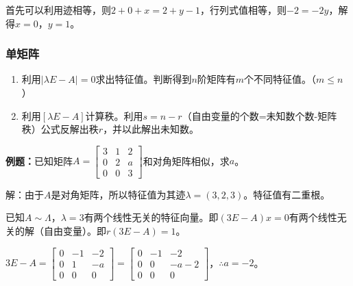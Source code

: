 首先可以利用迹相等，则$2+0+x=2+y-1$，行列式值相等，则$-2=-2y$，解得$x=0$，$y=1$。

\subsubsection{单矩阵}



\begin{enumerate}
    \item 利用$\vert\lambda E-A\vert=0$求出特征值。判断得到$n$阶矩阵有$m$个不同特征值。（$m\leqslant n$）
    \item 利用$[\lambda E-A]$计算秩。利用$s=n-r$（自由变量的个数=未知数个数-矩阵秩）公式反解出秩$r$，并以此解出未知数。
\end{enumerate}

\textbf{例题：}已知矩阵$A=\left[\begin{array}{ccc}
    3 & 1 & 2 \\
    0 & 2 & a \\
    0 & 0 & 3
\end{array}\right]$和对角矩阵相似，求$a$。\medskip

解：由于$A$是对角矩阵，所以特征值为其迹$\lambda=(3,2,3)$。特征值有二重根。

已知$A\sim\Lambda$，$\lambda=3$有两个线性无关的特征向量。即$(3E-A)x=0$有两个线性无关的解（自由变量）。即$r(3E-A)=1$。

$3E-A=\left[\begin{array}{ccc}
    0 & -1 & -2 \\
    0 & 1 & -a \\
    0 & 0 & 0
\end{array}\right]=\left[\begin{array}{ccc}
    0 & -1 & -2 \\
    0 & 0 & -a-2 \\
    0 & 0 & 0
\end{array}\right]$，$\therefore a=-2$。

